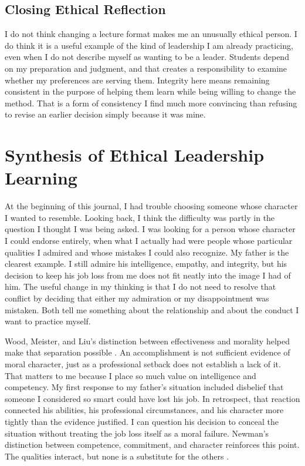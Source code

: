 \documentclass[12pt,stu,biblatex]{apa7}
\begin{document}
\subsection{Closing Ethical Reflection}
I do not think changing a lecture format makes me an unusually ethical person.
I do think it is a useful example of the kind of leadership I am already practicing, even when I do not describe myself as wanting to be a leader.
Students depend on my preparation and judgment, and that creates a responsibility to examine whether my preferences are serving them.
Integrity here means remaining consistent in the purpose of helping them learn while being willing to change the method.
That is a form of consistency I find much more convincing than refusing to revise an earlier decision simply because it was mine.

\newpage
\section{Synthesis of Ethical Leadership Learning}

At the beginning of this journal, I had trouble choosing someone whose character I wanted to resemble.
Looking back, I think the difficulty was partly in the question I thought I was being asked.
I was looking for a person whose character I could endorse entirely, when what I actually had were people whose particular qualities I admired and whose mistakes I could also recognize.
My father is the clearest example.
I still admire his intelligence, empathy, and integrity, but his decision to keep his job loss from me does not fit neatly into the image I had of him.
The useful change in my thinking is that I do not need to resolve that conflict by deciding that either my admiration or my disappointment was mistaken.
Both tell me something about the relationship and about the conduct I want to practice myself.

Wood, Meister, and Liu's distinction between effectiveness and morality helped make that separation possible \parencite{wood2021goodbadevil}.
An accomplishment is not sufficient evidence of moral character, just as a professional setback does not establish a lack of it.
That matters to me because I place so much value on intelligence and competency.
My first response to my father's situation included disbelief that someone I considered so smart could have lost his job.
In retrospect, that reaction connected his abilities, his professional circumstances, and his character more tightly than the evidence justified.
I can question his decision to conceal the situation without treating the job loss itself as a moral failure.
Newman's distinction between competence, commitment, and character reinforces this point.
The qualities interact, but none is a substitute for the others \parencite[ch. 1]{Newman2019building}.
\end{document}
